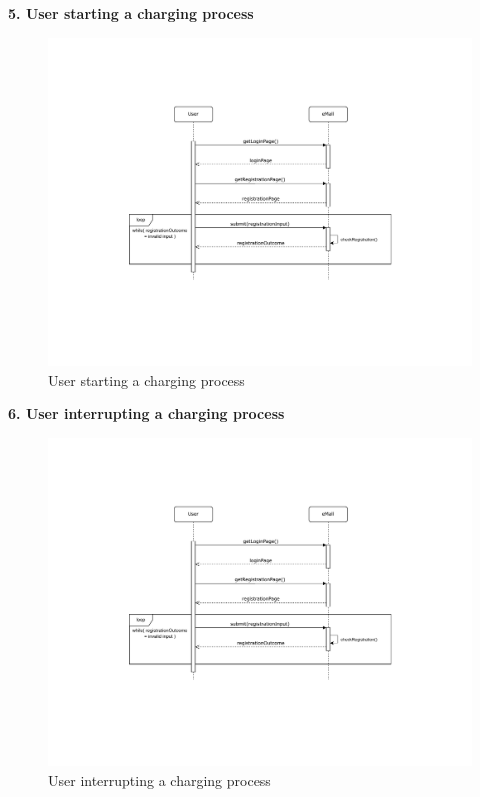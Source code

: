 \documentclass[11pt]{article}
\begin{document}
\begin{description}
    \item \textbf{5. User starting a charging process}
    \begin{figure}[!ht]
        \centering
        \includegraphics[page={5}, trim=1cm 8cm 0.5cm 2cm, width=\linewidth, clip]{SequenceDiagrams.pdf}
        \caption{User starting a charging process}
    \end{figure}
    
    \newpage
    
    \item \textbf{6. User interrupting a charging process}
    \begin{figure}[!ht]
        \centering
        \includegraphics[page={6}, trim=1cm 6.5cm 0.5cm 2cm, width=\linewidth, clip]{SequenceDiagrams.pdf}
        \caption{User interrupting a charging process}
    \end{figure}
    

\end{description}
\end{document}
